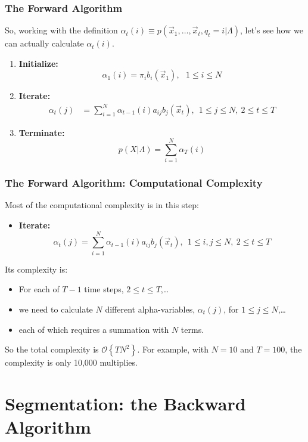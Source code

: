 \documentclass{beamer}
\begin{document}
\begin{frame}
  \frametitle{The Forward Algorithm}

  So, working with the definition $\alpha_t(i) \equiv
  p(\vec{x}_1,\ldots,\vec{x}_t,q_t=i|\Lambda)$, let's see how we can
  actually calculate $\alpha_t(i)$.
  \begin{enumerate}
  \item {\bf Initialize:}
    \[
    \alpha_1(i) = \pi_i b_i(\vec{x}_1),~~~1\le i\le N
    \]
  \item {\bf Iterate:}
    \begin{align*}
      \alpha_{t}(j) &= \sum_{i=1}^N \alpha_{t-1}(i) a_{ij}b_j(\vec{x}_t),~~1\le j\le N,~2\le t\le T
    \end{align*}
  \item {\bf Terminate:}
    \[
    p(X|\Lambda) = \sum_{i=1}^N \alpha_T(i)
    \]
  \end{enumerate}
\end{frame}
  
\begin{frame}
  \frametitle{The Forward Algorithm: Computational Complexity}

  Most of the computational complexity is in this step:
  \begin{itemize}
  \item {\bf Iterate:}
    \[
    \alpha_{t}(j) = \sum_{i=1}^N \alpha_{t-1}(i) a_{ij}b_j(\vec{x}_t),~~1\le i,j\le N,~2\le t\le T
    \]
  \end{itemize}
  Its complexity is:
  \begin{itemize}
  \item For each of $T-1$ time steps, $2\le t\le T$,\ldots
  \item we need to calculate $N$ different alpha-variables, $\alpha_t(j)$, for $1\le j\le N$,\ldots
  \item each of which requires a summation with $N$ terms.
  \end{itemize}
  So the total complexity is ${\mathcal O}\left\{TN^2\right\}$.  For
  example, with $N=10$ and $T=100$, the complexity is only 10,000
  multiplies.
\end{frame}

\section[Segmentation]{Segmentation: the Backward Algorithm}
\setcounter{subsection}{1}
\end{document}
